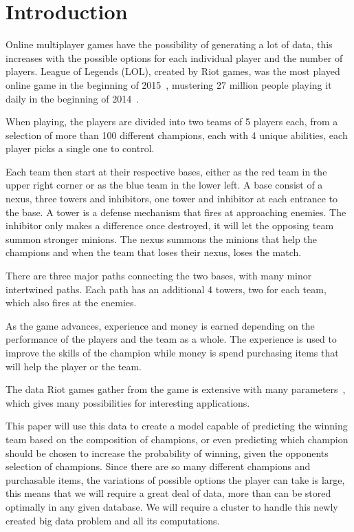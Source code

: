 \section{Introduction}\label{sec:intro}

Online multiplayer games have the possibility of generating a lot of data, this increases with the possible options for each individual player and the number of players. 
League of Legends (LOL), created by Riot games, was the most played online game in the beginning of 2015~\cite{LoLmostplayed}, mustering 27 million people playing it daily in the beginning of 2014~\cite{LoL27mill}. 

When playing, the players are divided into two teams of 5 players each, from a selection of more than 100 different champions, each with 4 unique abilities, each player picks a single one to control.

Each team then start at their respective bases, either as the red team in the upper right corner or as the blue team in the lower left. 
A base consist of a nexus, three towers and inhibitors, one tower and inhibitor at each entrance to the base. A tower is a defense mechanism that fires at approaching enemies. The inhibitor only makes a difference once destroyed, it will let the opposing team summon stronger minions. The nexus summons the minions that help the champions and when the team that loses their nexus, loses the match.

There are three major paths connecting the two bases, with many minor intertwined paths. Each path has an additional 4 towers, two for each team, which also fires at the enemies.

As the game advances, experience and money is earned depending on the performance of the players and the team as a whole. The experience is used to improve the skills of the champion while money is spend purchasing items that will help the player or the team. 

The data Riot games gather from the game is extensive with many parameters~\cite{LoLparameters}, which gives many possibilities for interesting applications. 

This paper will use this data to create a model capable of predicting the winning team based on the composition of champions, or even predicting which champion should be chosen to increase the probability of winning, given the opponents selection of champions. Since there are so many different champions and purchasable items, the variations of possible options the player can take is large, this means that we will require a great deal of data, more than can be stored optimally in any given database. We will require a cluster to handle this newly created big data problem and all its computations.


